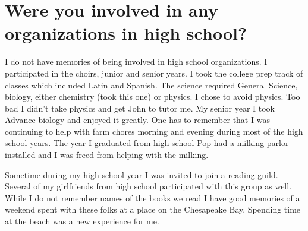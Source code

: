 \section{Were you involved in any organizations in high school?}
I do not have memories of being involved in high school organizations.
I participated in the choirs, junior and senior years.
I took the college prep track of classes which included Latin and Spanish.
The science required General Science, biology, either chemistry (took this one) or physics.
I chose to avoid physics.
Too bad I didn't take physics and get John to tutor me.
My senior year I took Advance biology and enjoyed it greatly.
One has to remember that I was continuing to help with farm chores morning and evening during most of the high school years.
The year I graduated from high school Pop had a milking parlor installed and I was freed from helping with the milking.

Sometime during my high school year I was invited to join a reading guild.
Several of my girlfriends from high school participated with this group as well.
While I do not remember names of the books we read I have good memories of a weekend spent with these folks at a place on the Chesapeake Bay.
Spending time at the beach was a new experience for me.






